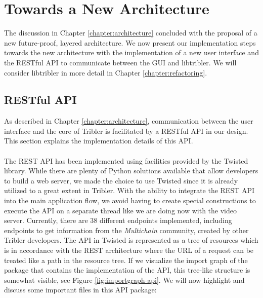 \chapter{Towards a New Architecture}
\label{chapter:towards-new-architecture}
The discussion in Chapter \ref{chapter:architecture} concluded with the proposal of a new future-proof, layered architecture. We now present our implementation steps towards the new architecture with the implementation of a new user interface and the RESTful API to communicate between the GUI and libtribler. We will consider libtribler in more detail in Chapter \ref{chapter:refactoring}.

\section{RESTful API}
\label{sec:restful-api}
As described in Chapter \ref{chapter:architecture}, communication between the user interface and the core of Tribler is facilitated by a RESTful API in our design. This section explains the implementation details of this API.\\\\
The REST API has been implemented using facilities provided by the Twisted library. While there are plenty of Python solutions available that allow developers to build a web server, we made the choice to use Twisted since it is already utilized to a great extent in Tribler. With the ability to integrate the REST API into the main application flow, we avoid having to create special constructions to execute the API on a separate thread like we are doing now with the video server. Currently, there are 38 different endpoints implemented, including endpoints to get information from the \emph{Multichain} community, created by other Tribler developers. The API in Twisted is represented as a tree of resources which is in accordance with the REST architecture where the URL of a request can be treated like a path in the resource tree. If we visualize the import graph of the package that contains the implementation of the API, this tree-like structure is somewhat visible, see Figure \ref{fig:importgraph-api}. We will now highlight and discuss some important files in this API package:
